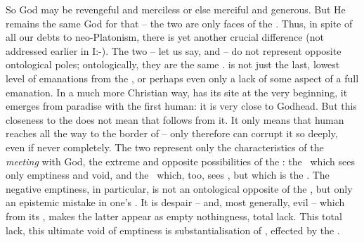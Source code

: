 So God may be revengeful and merciless or else merciful and generous. 
But He
remains the same God for that -- the two are only faces of the .
Thus, in
spite of all our debts to neo-Platonism, there is yet another crucial difference (not
addressed earlier in I:-).
The two 
-- let us say,  and  -- do not represent opposite ontological poles;
ontologically, they are the same .  is not just
the last, lowest level of emanations from the , or perhaps even only a
lack of some aspect of a full emanation. In a much more Christian way,
 has its site at the very beginning, it emerges from paradise with the
first human: %
it is very {close to} Godhead.
But this closeness to the  does not mean that  follows from
it. It only means that human  reaches all the way to the border of
 -- only therefore  can corrupt it so deeply, even if
never completely. 
The two represent only the characteristics of the {\em meeting} with
God, the extreme and opposite possibilities of
the : the \No\ which sees only emptiness and void,
and the \Yes\ which, too, sees , but  which is
the .
%
The negative emptiness, in particular, is not an ontological opposite of the 
, but only an epistemic mistake in one's . It is despair -- and, 
most generally, evil -- which  from its ,
makes the latter appear as empty nothingness, total lack. This total lack,
this ultimate void of emptiness is substantialisation of , effected
by the \No.

